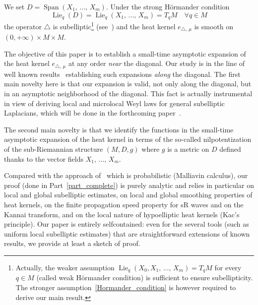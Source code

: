 \documentclass[10pt]{amsart}
\theoremstyle{definition}\newtheorem{defi}[theo]{Definition}\newtheorem{rema}[theo]{Remark}\newtheorem{exam}[theo]{Example}\newtheorem{exem}[theo]{Example}\newtheorem{nota}[theo]{Notation}
\DeclareMathOperator{\Span}{Span}
\DeclareMathOperator{\Lie}{Lie}
\let\oldforall\forall
\renewcommand*{\forall}{\mathrel{\oldforall}}
\begin{document}
We set $D=\Span(X_1,\,\ldots,\,X_m)$. Under the strong H\"ormander condition
\begin{equation}\label{Hormander_condition}
\Lie_q(D)=\Lie_q(X_1,\,\ldots,\,X_m)=T_qM\quad\forall q\in M
\end{equation}
the operator $\triangle$ is subelliptic\footnote{Actually, the weaker assumption $\Lie_q(X_0,X_1,\,\ldots,\,X_m)=T_qM$ for every $q\in M$ (called weak H\"ormander condition) is sufficient to ensure subellipticity. The stronger assumption~\eqref{Hormander_condition} is however required to derive our main result.} (see~\cite{Ho-67}) and the heat kernel $e_{\triangle,\,\mu}$ is smooth on $(0,+\infty)\times M\times M$.


The objective of this paper is to establish a small-time asymptotic expansion of the heat kernel $e_{\triangle,\,\mu}$ at any order \emph{near} the diagonal. Our study is in the line of well known results~\cite{BenArous_AIF1989, Metivier1976} establishing such expansions \emph{along} the diagonal. The first main novelty here is that our expansion is valid, not only along the diagonal, but in an asymptotic neighborhood of the diagonal. This fact is actually instrumental in view of deriving local and microlocal Weyl laws for general subelliptic Laplacians, which will be done in the forthcoming paper~\cite{CHT-II}.

The second main novelty is that we identify the functions in the small-time asymptotic expansion of the heat kernel in terms of the so-called nilpotentization of the sub-Riemannian structure $(M,D,g)$ where $g$ is a metric on $D$ defined thanks to the vector fields $X_1,\,\ldots,\,X_m$.

Compared with the approach of~\cite{BenArous_AIF1989} which is probabilistic (Malliavin calculus), our proof (done in Part~\ref{part_complete}) is purely analytic and relies in particular on local and global subelliptic estimates, on local and global smoothing properties of heat kernels, on the finite propagation speed property for sR waves and on the Kannai transform, and on the local nature of hypoelliptic heat kernels (Kac's principle). Our paper is entirely selfcontained: even for the several tools (such as uniform local subelliptic estimates) that are straightforward extensions of known results, we provide at least a sketch of proof.
\goodbreak
\end{document}
